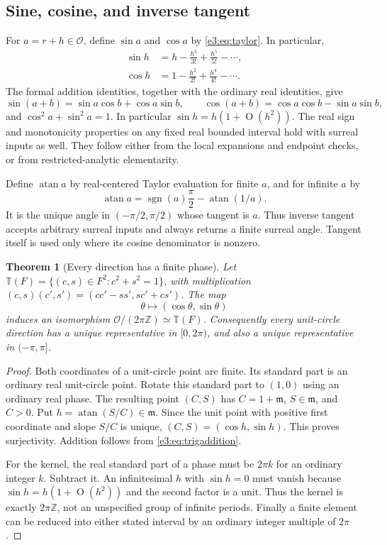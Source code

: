 \documentclass[11pt,letterpaper]{article}
\numberwithin{equation}{section}
\newtheorem{theorem}{Theorem}[section]
\theoremstyle{definition}
\theoremstyle{remark}
\newcommand{\Z}{\mathbb Z}
\newcommand{\TT}{\mathbb T}
\newcommand{\OO}{\mathcal O}
\newcommand{\mm}{\mathfrak m}
\newcommand{\atan}{\operatorname{atan}}
\newcommand{\sgn}{\operatorname{sgn}}
\newcommand{\smallO}{\operatorname{O}}
\begin{document}
\subsection{Sine, cosine, and inverse tangent}

For $a=r+h\in\OO$, define $\sin a$ and $\cos a$ by
\cref{e3:eq:taylor}. In particular,
\begin{align}
 \sin h&=h-\frac{h^3}{3!}+\frac{h^5}{5!}-\cdots,\label{e3:eq:sininf}\\
 \cos h&=1-\frac{h^2}{2!}+\frac{h^4}{4!}-\cdots.\label{e3:eq:cosinf}
\end{align}
The formal addition identities, together with the ordinary real identities,
give
\begin{equation}\label{e3:eq:trigaddition}
 \sin(a+b)=\sin a\cos b+\cos a\sin b,\qquad
 \cos(a+b)=\cos a\cos b-\sin a\sin b,
\end{equation}
and $\cos^2a+\sin^2a=1$. In particular $\sin h=h(1+\smallO(h^2))$.
The real sign and monotonicity properties on any fixed real bounded interval
hold with surreal inputs as well. They follow either from the local
expansions and endpoint checks, or from restricted-analytic elementarity.

Define $\atan a$ by real-centered Taylor evaluation for finite $a$, and for
infinite $a$ by
\begin{equation}\label{e3:eq:ataninfinite}
 \atan a=\sgn(a)\frac\pi2-\atan(1/a).
\end{equation}
It is the unique angle in $(-\pi/2,\pi/2)$ whose tangent is $a$.
Thus inverse tangent accepts arbitrary surreal inputs and always returns a
finite surreal angle. Tangent itself is used only where its cosine denominator
is nonzero.

\begin{theorem}[Every direction has a finite phase]\label{e3:thm:phase}
Let
$\TT(F)=\{(c,s)\in F^2:c^2+s^2=1\}$, with multiplication
$(c,s)(c',s')=(cc'-ss',sc'+cs')$. The map
\[
 \theta\longmapsto(\cos\theta,\sin\theta)
\]
induces an isomorphism $\OO/(2\pi\Z)\simeq \TT(F)$.
Consequently every unit-circle direction has a unique representative in
$[0,2\pi)$, and also a unique representative in $(-\pi,\pi]$.
\end{theorem}
\begin{proof}
Both coordinates of a unit-circle point are finite. Its standard part is an
ordinary real unit-circle point. Rotate this standard part to $(1,0)$ using
an ordinary real phase. The resulting point $(C,S)$ has $C=1+\mm$, $S\in\mm$,
and $C>0$. Put $h=\atan(S/C)\in\mm$. Since the unit point with positive first
coordinate and slope $S/C$ is unique, $(C,S)=(\cos h,\sin h)$. This proves
surjectivity. Addition follows from \cref{e3:eq:trigaddition}.

For the kernel, the real standard part of a phase must be $2\pi k$ for an
ordinary integer $k$. Subtract it. An infinitesimal $h$ with $\sin h=0$
must vanish because $\sin h=h(1+\smallO(h^2))$ and the second factor is a
unit. Thus the kernel is exactly $2\pi\Z$, not an unspecified group of
infinite periods. Finally a finite element can be reduced into either stated
interval by an ordinary integer multiple of $2\pi$.
\end{proof}
\end{document}
